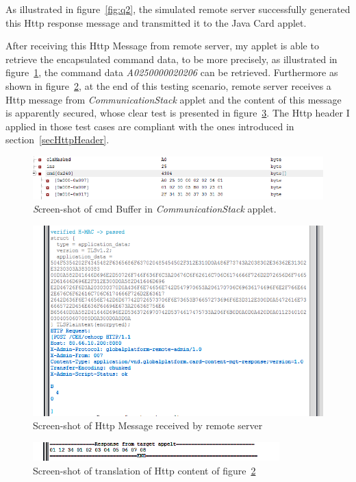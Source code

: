 As illustrated in figure~\ref{fig:q2}, the simulated remote server successfully generated this Http response message and transmitted it to the Java Card applet.

After receiving this Http Message from remote server, my applet is able to retrieve the encapsulated command data, to be more precisely, as illustrated in figure~\ref{fig:remote1}, the command data \emph{A0250000020206} can be retrieved. Furthermore as shown in figure~\ref{fig:q3}, at the end of this testing scenario, remote server receives a Http message from \emph{CommunicationStack} applet and the content of this message is apparently secured, whose clear test is presented in figure~\ref{fig:q4}.
The Http header I applied in those test cases are compliant with the ones introduced in section~\ref{secHttpHeader}.


\begin{figure}[!htb]
	\centering
	\includegraphics[width=1.2\textwidth]{Images/impl/cmd.png}
		\caption{\emph Screen-shot of {cmd} Buffer in \emph{CommunicationStack} applet.}
	\label{fig:remote1}
\end{figure}

\begin{figure}[!htb]
	\centering
	\includegraphics[width=1\textwidth]{q3.png}
		\caption{Screen-shot of Http Message received by remote server}
	\label{fig:q3}
\end{figure}

\begin{figure}[!htb]
	\centering
	\includegraphics[width=0.85\textwidth]{q4.png}
		\caption{Screen-shot of translation of Http content of figure~\ref{fig:q3}}
	\label{fig:q4}
\end{figure}

